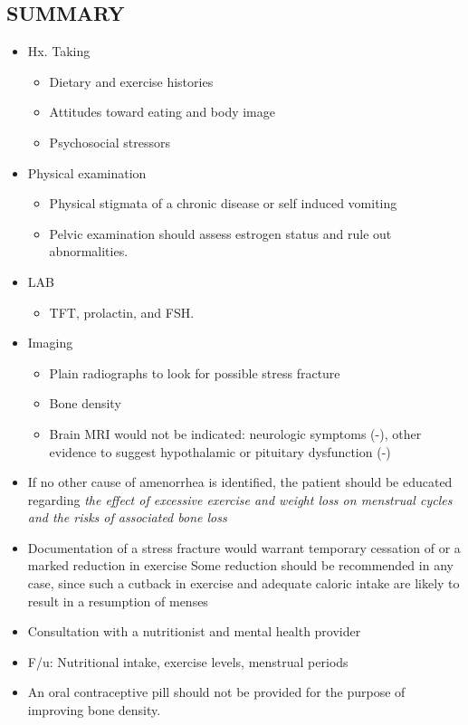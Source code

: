 \subsection{SUMMARY}
\begin{itemize}\tightlist
\item Hx. Taking
	\begin{itemize}\tightlist
	\item Dietary and exercise histories
	\item Attitudes toward eating and body image
	\item Psychosocial stressors
	\end{itemize}
\item Physical examination 
	\begin{itemize}\tightlist
	\item Physical stigmata of a chronic disease or self induced vomiting
	\item Pelvic examination should assess estrogen status and rule out abnormalities.
	\end{itemize}
\item LAB
	\begin{itemize}\tightlist
	\item TFT, prolactin, and FSH. 
	\end{itemize}
\item Imaging
	\begin{itemize}\tightlist
	\item Plain radiographs to look for possible stress fracture
	\item Bone density
	\item Brain MRI would not be indicated: neurologic symptoms (-), other evidence to suggest hypothalamic or pituitary dysfunction (-)
	\end{itemize}
\item If no other cause of amenorrhea is identified, the patient should be educated regarding \emph{the effect of excessive exercise and weight loss on menstrual cycles and the risks of associated bone loss}
\item Documentation of a stress fracture would warrant temporary cessation of or a marked reduction in exercise
Some reduction should be recommended in any case, since such a cutback in exercise and adequate caloric intake are likely to result in a resumption of menses
\item Consultation with a nutritionist and mental health provider
\item F/u: Nutritional intake, exercise levels, menstrual periods
\item An oral contraceptive pill should not be provided for the purpose of improving bone density.
\end{itemize}
